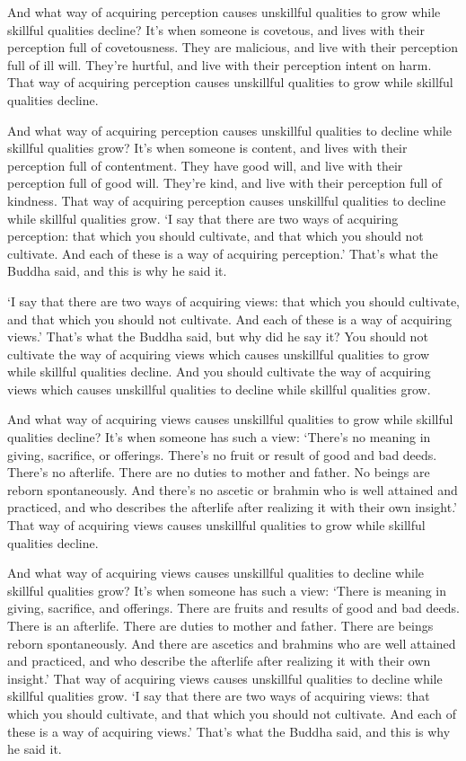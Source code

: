 \documentclass[12pt,openany]{book}%
\begin{document}
And what way of acquiring perception causes unskillful qualities to grow while skillful qualities decline? It’s when someone is covetous, and lives with their perception full of covetousness. They are malicious, and live with their perception full of ill will. They’re hurtful, and live with their perception intent on harm. That way of acquiring perception causes unskillful qualities to grow while skillful qualities decline. 

And what way of acquiring perception causes unskillful qualities to decline while skillful qualities grow? It’s when someone is content, and lives with their perception full of contentment. They have good will, and live with their perception full of good will. They’re kind, and live with their perception full of kindness. That way of acquiring perception causes unskillful qualities to decline while skillful qualities grow. ‘I say that there are two ways of acquiring perception: that which you should cultivate, and that which you should not cultivate. And each of these is a way of acquiring perception.’ That’s what the Buddha said, and this is why he said it. 

‘I say that there are two ways of acquiring views: that which you should cultivate, and that which you should not cultivate. And each of these is a way of acquiring views.’ That’s what the Buddha said, but why did he say it? You should not cultivate the way of acquiring views which causes unskillful qualities to grow while skillful qualities decline. And you should cultivate the way of acquiring views which causes unskillful qualities to decline while skillful qualities grow. 

And what way of acquiring views causes unskillful qualities to grow while skillful qualities decline? It’s when someone has such a view: ‘There’s no meaning in giving, sacrifice, or offerings. There’s no fruit or result of good and bad deeds. There’s no afterlife. There are no duties to mother and father. No beings are reborn spontaneously. And there’s no ascetic or brahmin who is well attained and practiced, and who describes the afterlife after realizing it with their own insight.’ That way of acquiring views causes unskillful qualities to grow while skillful qualities decline. 

And what way of acquiring views causes unskillful qualities to decline while skillful qualities grow? It’s when someone has such a view: ‘There is meaning in giving, sacrifice, and offerings. There are fruits and results of good and bad deeds. There is an afterlife. There are duties to mother and father. There are beings reborn spontaneously. And there are ascetics and brahmins who are well attained and practiced, and who describe the afterlife after realizing it with their own insight.’ That way of acquiring views causes unskillful qualities to decline while skillful qualities grow. ‘I say that there are two ways of acquiring views: that which you should cultivate, and that which you should not cultivate. And each of these is a way of acquiring views.’ That’s what the Buddha said, and this is why he said it. 
\end{document}

